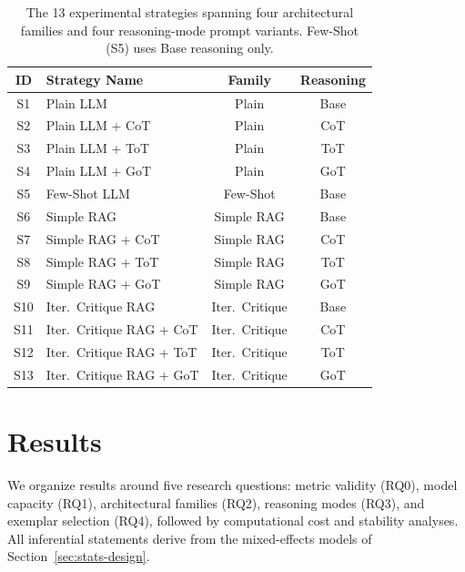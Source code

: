\documentclass[pdflatex,sn-mathphys-ay]{sn-jnl}%
\theoremstyle{thmstyleone}%
\theoremstyle{thmstyletwo}%
\theoremstyle{thmstylethree}%
\begin{document}
\begin{table}[t]
\centering
\small
\setlength{\tabcolsep}{6pt}
\caption{The 13 experimental strategies spanning four architectural families and four reasoning-mode prompt variants. Few-Shot (S5) uses Base reasoning only.}
\begin{tabular}{clcc}
\toprule
\textbf{ID} & \textbf{Strategy Name} & \textbf{Family} & \textbf{Reasoning} \\
\midrule
S1  & Plain LLM                 & Plain           & Base \\
S2  & Plain LLM + CoT           & Plain           & CoT  \\
S3  & Plain LLM + ToT           & Plain           & ToT  \\
S4  & Plain LLM + GoT           & Plain           & GoT  \\
\midrule
S5  & Few-Shot LLM              & Few-Shot        & Base \\
\midrule
S6  & Simple RAG                & Simple RAG      & Base \\
S7  & Simple RAG + CoT          & Simple RAG      & CoT  \\
S8  & Simple RAG + ToT          & Simple RAG      & ToT  \\
S9  & Simple RAG + GoT          & Simple RAG      & GoT  \\
\midrule
S10 & Iter.\ Critique RAG       & Iter.\ Critique & Base \\
S11 & Iter.\ Critique RAG + CoT & Iter.\ Critique & CoT  \\
S12 & Iter.\ Critique RAG + ToT & Iter.\ Critique & ToT  \\
S13 & Iter.\ Critique RAG + GoT & Iter.\ Critique & GoT  \\
\bottomrule
\end{tabular}
\label{tab:strategy-matrix}
\end{table}

\section{Results}
\label{sec:results}

We organize results around five research questions: metric validity (RQ0), model capacity (RQ1), architectural families (RQ2), reasoning modes (RQ3), and exemplar selection (RQ4), followed by computational cost and stability analyses. All inferential statements derive from the mixed-effects models of Section~\ref{sec:stats-design}.

\end{document}
